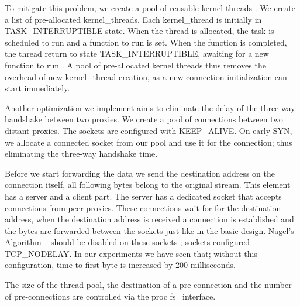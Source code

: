 To mitigate this problem, we create a pool of reusable kernel threads . We create a list of pre-allocated kernel\_threads. Each kernel\_thread is initially in TASK\_INTERRUPTIBLE state. When the thread is allocated, the task is scheduled to run and a function to run is set. When the function is completed, the thread return to state TASK\_INTERRUPTIBLE, awaiting for a new function to run . A pool of pre-allocated kernel threads thus removes the overhead of new kernel\_thread creation, as a new connection initialization can start immediately. 

 
Another optimization we implement aims to eliminate the delay of the three way handshake between two proxies. We create a pool of connections between two distant proxies. The sockets are configured with KEEP\_ALIVE. On early SYN, we allocate a connected socket from our pool and use it for the connection; thus eliminating the three-way handshake time. 

Before we start forwarding the data we send the destination address on the connection itself, all following bytes belong to the original stream. 
This element has a server and a client part. The server has a dedicated socket that accepts connections from peer-proxies. These connections wait for for the destination address, when the destination address is received a connection is established and the bytes are forwarded between the sockets just like in the basic design. 
Nagel's Algorithm ~\cite{nagel} should be disabled on these sockets ; sockets configured TCP\_NODELAY. In our experiments we have seen that; without this configuration, time to first byte is increased by 200 milliseconds.  


 The size of the thread-pool, the destination of a pre-connection and the number of pre-connections are controlled via the proc fs~\cite{proc} interface.

